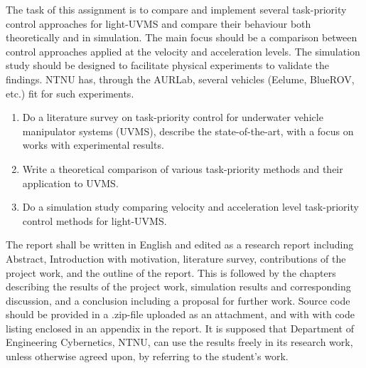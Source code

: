 The task of this assignment is to compare and implement several task-priority control
approaches for light-UVMS and compare their behaviour both theoretically and in simulation.
The main focus should be a comparison between control approaches applied at the velocity and
acceleration levels. The simulation study should be designed to facilitate physical experiments
to validate the findings. NTNU has, through
the AURLab, several vehicles (Eelume, BlueROV, etc.) fit for such experiments.
\newpage
\begin{enumerate}
\item Do a literature survey on task-priority control for underwater vehicle manipulator
systems (UVMS), describe the state-of-the-art, with a focus on works with experimental
results.
\item Write a theoretical comparison of various task-priority methods and their application to
UVMS.
\item Do a simulation study comparing velocity and acceleration level task-priority control
methods for light-UVMS.
\end{enumerate}
The report shall be written in English and edited as a research report including Abstract,
Introduction with motivation, literature survey, contributions of the project work, and the outline
of the report. This is followed by the chapters describing the results of the project work,
simulation results and corresponding discussion, and a conclusion including a proposal for
further work. Source code should be provided in a .zip-file uploaded as an attachment, and with
with code listing enclosed in an appendix in the report. It is supposed that Department of
Engineering Cybernetics, NTNU, can use the results freely in its research work, unless otherwise
agreed upon, by referring to the student’s work.
